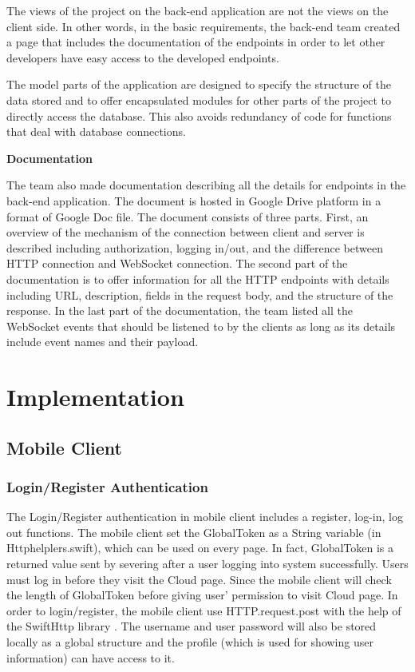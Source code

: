 \documentclass{article}
\begin{document}
The views of the project on the back-end application are not the views on the client side. In other words, in the basic requirements, the back-end team created a page that includes the documentation of the endpoints in order to let other developers have easy access to the developed endpoints.  

The model parts of the application are designed to specify the structure of the data stored and to offer encapsulated modules for other parts of the project to directly access the database. This also avoids redundancy of code for functions that deal with database connections.

\newline
\textbf{Documentation}

The team also made documentation describing all the details for endpoints in the back-end application. The document is hosted in Google Drive platform in a format of Google Doc file. The document consists of three parts. First, an overview of the mechanism of the connection between client and server is described including authorization, logging in/out, and the difference between HTTP connection and WebSocket connection. The second part of the documentation is to offer information for all the HTTP endpoints with details including URL, description, fields in the request body, and the structure of the response. In the last part of the documentation, the team listed all the WebSocket events that should be listened to by the clients as long as its details include event names and their payload.

\newpage
\section{Implementation}
\subsection{Mobile Client}
\subsubsection{Login/Register Authentication}

The Login/Register authentication in mobile client includes a register, log-in, log out functions. The mobile client set the GlobalToken as a String variable (in Httphelplers.swift), which can be used on every page. In fact, GlobalToken is a returned value sent by severing after a user logging into system successfully. Users must log in before they visit the Cloud page. Since the mobile client will check the length of GlobalToken before giving user' permission to visit Cloud page. In order to login/register, the mobile client use HTTP.request.post with the help of the SwiftHttp library \cite{c11}. The username and user password will also be stored locally as a global structure and the profile (which is used for showing user information) can have access to it.
\end{document}
